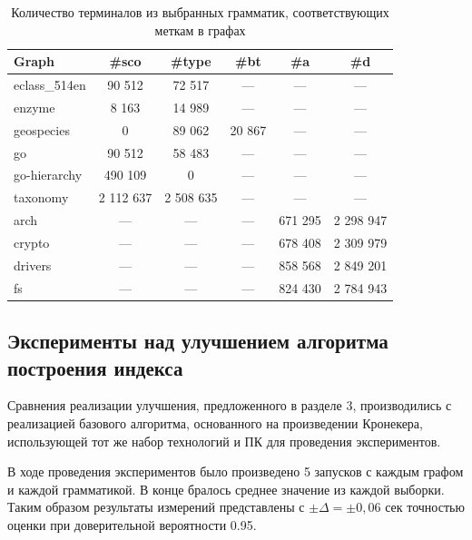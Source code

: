 \begin{table}[H]
\begin{center}
{

\begin{tabular}{|l|c|c|c|c|c|}
\hline
Graph          & \#sco & \#type &\#bt & \#a  & \#d \\
\hline
\hline
eclass\_514en  & 90 512    & 72 517    &        ---        & ---  & --- \\
enzyme         & 8 163     & 14 989    &        ---        & ---  & --- \\
geospecies     & 0         & 89 062    &        20 867     & ---  & --- \\
go             & 90 512    & 58 483    &        ---        & ---  & --- \\
go-hierarchy   & 490 109   & 0         &        ---        & ---  & --- \\
taxonomy       & 2 112 637 & 2 508 635 &        ---        & ---  & --- \\
\hline
arch           &      ---     &  ---   &        ---        & 671 295 & 2 298 947 \\
crypto         &      ---     &  ---   &        ---        & 678 408 & 2 309 979 \\
drivers        &      ---     &  ---   &        ---        & 858 568 & 2 849 201 \\
fs             &      ---     &  ---   &        ---        & 824 430 & 2 784 943 \\
\hline
\end{tabular}
}
\end{center}
\caption{Количество терминалов из выбранных грамматик, соответствующих меткам в графах}
\end{table}

\subsection{Эксперименты над улучшением алгоритма построения индекса}

Сравнения реализации улучшения, предложенного в разделе 3, производились с реализацией базового алгоритма, основанного на произведении Кронекера, использующей тот же набор технологий и ПК для проведения экспериментов. 


В ходе проведения экспериментов было произведено 5 запусков с каждым графом и каждой грамматикой. В конце бралось среднее значение из каждой выборки. Таким образом результаты измерений представлены с $\pm \Delta = \pm 0,06$ сек точностью оценки при доверительной вероятности 0.95.


